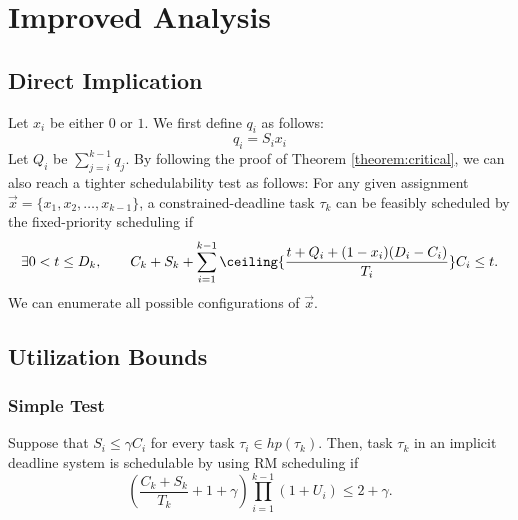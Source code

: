 \section{Improved Analysis}

\subsection{Direct Implication}

Let $x_i$ be either $0$ or $1$. We first define $q_i$ as follows:
\begin{equation}
  \label{eq:qi}
  q_i = S_i x_i
\end{equation}
Let $Q_i$ be $\sum_{j=i}^{k-1} q_j$.  
By following the proof of Theorem \ref{theorem:critical}, we can also reach a tighter schedulability test as follows: For any given assignment $\vec{x} = \{x_1, x_2, \ldots, x_{k-1}\}$, a constrained-deadline task $\tau_k$ can be feasibly scheduled by the fixed-priority scheduling if
\begin{equation} \label{eq:TDA-suspension-tighter} 
\exists 0 < t \leq D_k, \qquad C_k+S_k+ \sum_{i=1}^{k-1}\ceiling{\frac{t+Q_i+(1-x_i)(D_i-C_i)}{T_i}} C_i \leq t.
\end{equation}
We can enumerate all possible configurations of $\vec{x}$.
  
\subsection{Utilization Bounds}

\subsubsection{Simple Test}

Suppose that $S_i \leq \gamma C_i$ for every task $\tau_i \in hp(\tau_k)$. Then, task $\tau_k$ in an implicit deadline system is schedulable by using RM scheduling if
\[
(\frac{C_k + S_k}{ T_k}+1+\gamma) \prod_{i=1}^{k-1}(1+U_i) \leq 2+\gamma.
\]
  
  
  
  
  
  
  
  
  
  
  
  
  
  
  